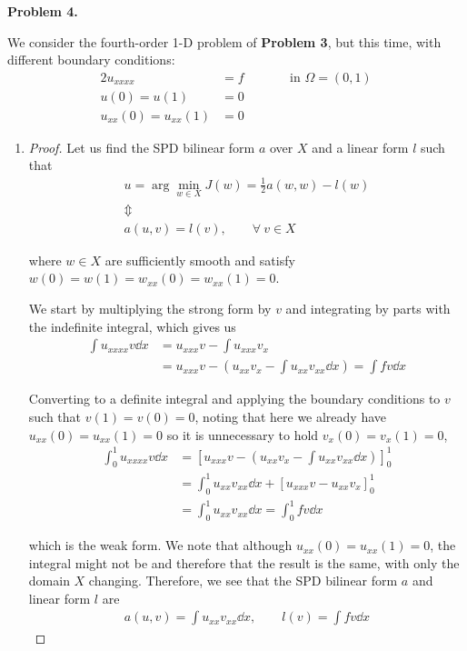 \textbf{Problem 4.}

We consider the fourth-order 1-D problem of \textbf{Problem 3}, but this time, with different boundary conditions:
\begin{alignat}{2}
    u_{xxxx} &= f \qquad&& \text{in $\Omega = (0,1)$} \\
    u(0) = u(1) &= 0 \\
    u_{xx}(0) = u_{xx}(1) &= 0
\end{alignat}

\begin{enumerate}[label=(\alph*),leftmargin=*,itemsep=0mm]

    \item \begin{proof} Let us find the SPD bilinear form $a$ over $X$ and a linear form $l$ such that
    \begin{gather*}
        u = \arg\min_{w\in X}J(w) = \frac{1}{2}a(w,w) - l(w) \\
        \Updownarrow \\
        a(u,v) = l(v), \qquad \forall\>v\in X
    \end{gather*}
    
    where $w\in X$ are sufficiently smooth and satisfy $w(0) = w(1) = w_{xx}(0) = w_{xx}(1) = 0$.
    
    We start by multiplying the strong form by $v$ and integrating by parts with the indefinite integral, which gives us
    \begin{align}
        \int u_{xxxx} v \dd{x} &= u_{xxx}v - \int u_{xxx}v_x \nonumber \\
        &= u_{xxx}v - \left( u_{xx}v_x - \int u_{xx}v_{xx} \dd{x} \right) = \int fv \dd{x}
    \end{align}
    
    Converting to a definite integral and applying the boundary conditions to $v$ such that $v(1) = v(0) = 0$, noting that here we already have $u_{xx}(0) = u_{xx}(1) = 0$ so it is unnecessary to hold $v_x(0) = v_x(1) = 0$,
    \begin{align}
        \int_0^1 u_{xxxx} v \dd{x}
        &= \left[ u_{xxx}v - \left( u_{xx}v_x - \int u_{xx}v_{xx} \dd{x} \right) \right]_0^1 \nonumber \\
        &= \int_0^1 u_{xx}v_{xx} \dd{x} + [u_{xxx}v-u_{xx}v_x]_0^1 \nonumber \\
        &= \int_0^1 u_{xx}v_{xx} \dd{x} = \int_0^1 fv \dd{x}
    \end{align}
    
    which is the weak form.  We note that although $u_{xx}(0) = u_{xx}(1) = 0$, the integral might not be and therefore that the result is the same, with only the domain $X$ changing.  Therefore, we see that the SPD bilinear form $a$ and linear form $l$ are
    \begin{align}
        a(u,v) = \int u_{xx}v_{xx} \dd{x}, \qquad l(v) = \int fv \dd{x}
    \end{align}
    

\end{proof}
\end{enumerate}
